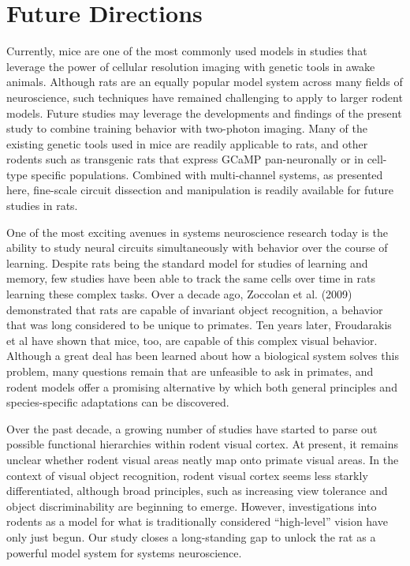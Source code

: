 \section{Future Directions}
Currently, mice are one of the most commonly used models in studies that leverage the power of cellular resolution imaging with genetic tools in awake animals. Although rats are an equally popular model system across many fields of neuroscience, such techniques have remained challenging to apply to larger rodent models. Future studies may leverage the developments and findings of the present study to combine training behavior with two-photon imaging. Many of the existing genetic tools used in mice are readily applicable to rats, and other rodents such as transgenic rats that express GCaMP pan-neuronally or in cell-type specific populations. Combined with multi-channel systems, as presented here, fine-scale circuit dissection and manipulation is readily available for future studies in rats. 

One of the most exciting avenues in systems neuroscience research today is the ability to study neural circuits simultaneously with behavior over the course of learning. Despite rats being the standard model for studies of learning and memory, few studies have been able to track the same cells over time in rats learning these complex tasks. Over a decade ago, Zoccolan et al. (2009) demonstrated that rats are capable of invariant object recognition, a behavior that was long considered to be unique to primates. Ten years later, Froudarakis et al have shown that mice, too, are capable of this complex visual behavior. Although a great deal has been learned about how a biological system solves this problem, many questions remain that are unfeasible to ask in primates, and rodent models offer a promising alternative by which both general principles and species-specific adaptations can be discovered. 

Over the past decade, a growing number of studies have started to parse out possible functional hierarchies within rodent visual cortex. At present, it remains unclear whether rodent visual areas neatly map onto primate visual areas. In the context of visual object recognition, rodent visual cortex seems less starkly differentiated, although broad principles, such as increasing view tolerance and object discriminability are beginning to emerge. However, investigations into rodents as a model for what is traditionally considered ``high-level'' vision have only just begun. Our study closes a long-standing gap to unlock the rat as a powerful model system for systems neuroscience. 

